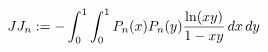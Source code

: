 
\begin{definition}\label{JJ_n}
    \leanok
    \[ JJ_n := - \int_{0}^{1}\int_{0}^{1} P_n(x)P_n(y)\frac{{\rm ln}(xy)}{1-xy} \, dx \, dy \]
\end{definition}

